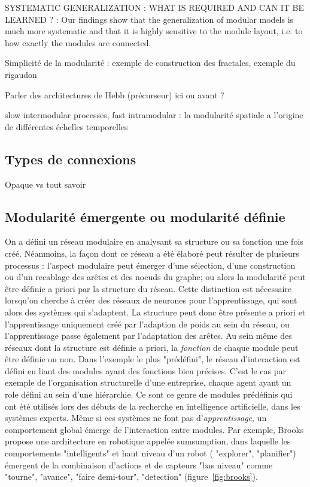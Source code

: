 SYSTEMATIC GENERALIZATION : WHAT IS REQUIRED
AND CAN IT BE LEARNED ? : 
Our findings show that the generalization of modular models is much more systematic and that it is highly sensitive to the module layout, i.e. to how exactly the modules are connected.

Simplicité de la modularité : exemple de construction des fractales, exemple du rigaudon

Parler des architectures de Hebb (précurseur) ici ou avant ?

slow intermodular processes, fast intramodular : la modularité spatiale a l'origine de différentes échelles temporelles \cite{Pan2009ModularityPS}


\subsection{Types de connexions}

Opaque vs tout savoir


\subsection{Modularité émergente ou modularité définie}

On a défini un réseau modulaire en analysant sa structure ou sa fonction une fois créé. Néanmoins, la façon dont ce réseau a été élaboré peut résulter de plusieurs processus : l'aspect modulaire peut émerger d'une sélection, d'une construction ou d'un recablage des arêtes et des noeuds du graphe; ou alors la modularité peut être définie a priori par la structure du réseau. Cette distinction est nécessaire lorsqu'on cherche à créer des réseaux de neurones pour l'apprentissage, qui sont alors des systèmes qui s'adaptent. La structure peut donc être présente a priori et l'apprentissage uniquement créé par l'adaption de poids au sein du réseau, ou l'apprentissage passe également par l'adaptation des arêtes.
Au sein même des réseaux dont la structure est définie a priori, la \emph{fonction} de chaque module peut être définie ou non. Dans l'exemple le plus "prédéfini", le réseau d'interaction est défini en liant des modules ayant des fonctions bien précises. C'est le cas par exemple de l'organisation structurelle d'une entreprise, chaque agent ayant un role défini au sein d'une hiérarchie. Ce sont ce genre de modules prédéfinis qui ont été utilisés lors des débuts de la recherche en intelligence artificielle, dans les systèmes experts. Même si ces systèmes ne font pas d'\emph{apprentissage}, un comportement global émerge de l'interaction entre modules. Par exemple, Brooks \cite{brooks_sumsumption_85} propose une architecture en robotique appelée sumsumption, dans laquelle les comportements "intelligents" et haut niveau d'un robot ( "explorer", "planifier") émergent de la combinaison d'actions et de capteurs "bas niveau" comme "tourne", "avance", "faire demi-tour", "detection" (figure~\ref{fig:brooks}).

